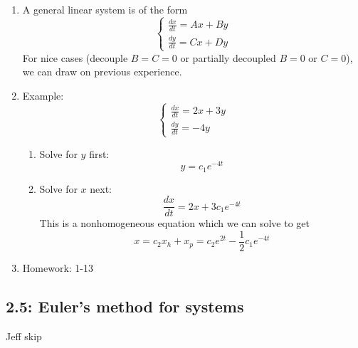 \documentclass{article}
\begin{document}
\begin{enumerate}

\item A general linear system is of the form
\[
\begin{cases}
\frac{dx}{dt} = Ax+By \\
\frac{dy}{dt} = Cx+Dy 
\end{cases}
\]
For nice cases (decouple $B=C=0$ or partially decoupled $B=0$ or $C=0$), we can draw on previous experience.

\item Example:
\[
\begin{cases}
\frac{dx}{dt} = 2x+3y \\
\frac{dy}{dt} = -4y 
\end{cases}
\]
\begin{enumerate}
\item Solve for $y$ first:
\[
y = c_1 e^{-4t}
\]
\item Solve for $x$ next:
\[
\frac{dx}{dt} = 2x + 3c_1 e^{-4t}
\]
This is a nonhomogeneous equation which we can solve to get
\[
x = c_2 x_h + x_p = c_2 e^{2t} - \frac{1}{2} c_1 e^{-4t}
\]
\end{enumerate}
\item Homework: 1-13

\end{enumerate}

\subsection{2.5: Euler's method for systems}
Jeff skip
\end{document}
